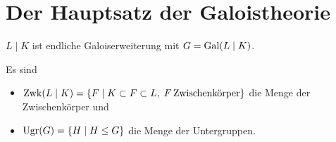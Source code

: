 \section{Der Hauptsatz der Galoistheorie}

$L\mid K$ ist endliche Galoiserweiterung mit $G = \operatorname{Gal}(L\mid K)$.

\begin{definition}
	Es sind \begin{itemize}
		\item $\operatorname{Zwk}(L\mid K) = \lbrace F\mid K\subset F\subset L,\;F\,\text{Zwischenkörper}\rbrace$ die Menge der Zwischenkörper und
		\item $\operatorname{Ugr}(G) = \lbrace H\mid H\le G\rbrace$ die Menge der Untergruppen.
	\end{itemize}
\end{definition}

